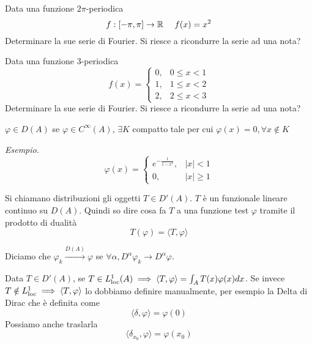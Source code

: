 Data una funzione $2\pi $-periodica
\begin{equation*}
f:[ -\pi ,\pi ]\rightarrow \RR  \ \ \ \ f(x)=x^{2}
\end{equation*}
Determinare la sue serie di Fourier. Si riesce a ricondurre la serie ad una nota?
\Esercizio{}

Data una funzione $3$-periodica
\begin{equation*}
f(x)=\begin{cases}
0, & 0\leq x< 1\\
1, & 1\leq x< 2\\
2, & 2\leq x< 3
\end{cases}
\end{equation*}
Determinare la sue serie di Fourier. Si riesce a ricondurre la serie ad una nota?
\Esercizio{}
\begin{defn}
 $\varphi \in D( A)$ se $\varphi \in C^{\infty }( A)$, $\exists K$ compatto tale per cui $\varphi ( x) =0,\forall x\notin K$
\end{defn}
\textit{Esempio.}
\begin{equation*}
\varphi ( x) =\begin{cases}
e^{-\frac{1}{1-x^{2}}} , & | x| < 1\\
0, & | x| \geqslant 1
\end{cases}
\end{equation*}
\begin{defn}
[Distribuzione] Si chiamano distribuzioni gli oggetti $T\in D'( A)$. $T$ è un funzionale lineare continuo su $D( A)$. Quindi so dire cosa fa $T$ a una funzione test $\varphi $ tramite il prodotto di dualità
\begin{equation*}
T( \varphi ) =\langle T,\varphi \rangle 
\end{equation*}
\end{defn}
\begin{defn}
 Diciamo che $\varphi _{k}\xrightarrow{D( A)} \varphi $ se $\forall \alpha ,D^{\alpha } \varphi _{k}\rightarrow D^{\alpha } \varphi $.
\end{defn}
\begin{defn}
 Data $T\in D'( A)$, se $T\in L^{1}_{\operatorname{loc}}( A) \implies \langle T,\varphi \rangle =\int _{A} T( x) \varphi ( x) dx$. Se invece $T\notin L^{1}_{\operatorname{loc}} \implies \langle T,\varphi \rangle $ lo dobbiamo definire manualmente, per esempio la Delta di Dirac che è definita come
\begin{equation*}
\langle \delta ,\varphi \rangle =\varphi ( 0)
\end{equation*}
Possiamo anche traslarla
\begin{equation*}
\langle \delta _{x_{0}} ,\varphi \rangle =\varphi ( x_{0})
\end{equation*}
\end{defn}
